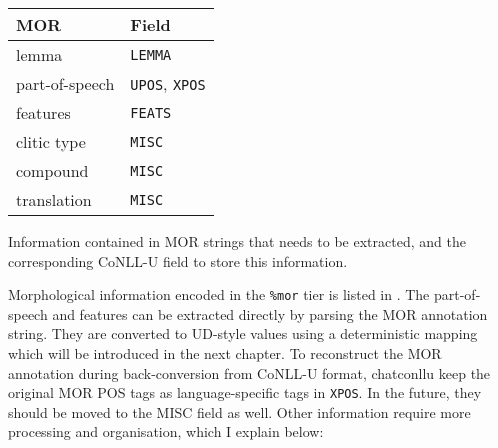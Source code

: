 \begin{margintable}[1\baselineskip]
\begin{tabularx}{1\textwidth}{@{}ll@{}}
\toprule
\textbf{MOR} & \textbf{Field}\\\midrule
lemma & \texttt{LEMMA} \\
part-of-speech & \texttt{UPOS}, \texttt{XPOS}\\
features & \texttt{FEATS} \\\addlinespace
clitic type & \texttt{MISC} \\
compound & \texttt{MISC} \\
translation & \texttt{MISC} \\\bottomrule
\end{tabularx}
\caption{\label{tab:martabmor}Information contained in MOR strings that needs to be extracted, and the corresponding CoNLL-U field to store this information.}
\footnotesize
\end{margintable}

Morphological information encoded in the \texttt{\%mor} tier is listed in . The part-of-speech and features can be extracted directly by parsing the MOR annotation string. They are converted to UD-style values using a deterministic mapping which will be introduced in the next chapter. To reconstruct the MOR annotation during back-conversion from CoNLL-U format, chatconllu keep the original MOR POS tags as language-specific tags in \texttt{XPOS}. In the future, they should be moved to the MISC field as well. Other information require more processing and organisation, which I explain below:


